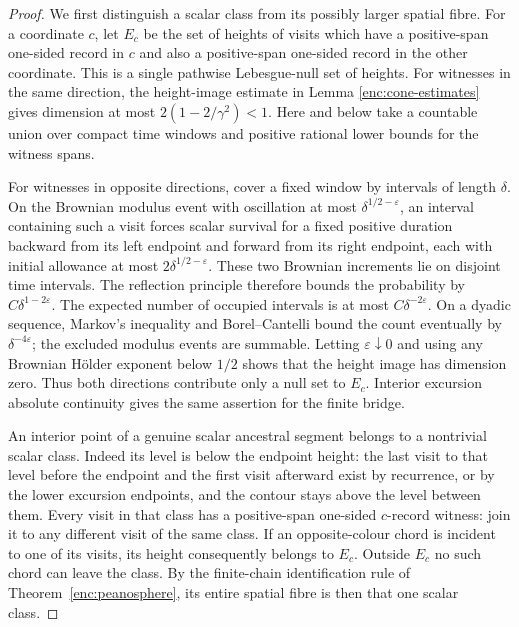 \documentclass[11pt]{article}
\numberwithin{equation}{section}
\theoremstyle{definition}
\theoremstyle{remark}
\newcommand{\1}{\mathbf 1}
\begin{document}
\begin{proof}
We first distinguish a scalar class from its possibly larger spatial
fibre.  For a coordinate \(c\), let \(E_c\) be the set of heights of
visits which have a positive-span one-sided record in \(c\) and also
a positive-span one-sided record in the other coordinate.  This is
a single pathwise Lebesgue-null set of heights.  For witnesses in the
same direction, the height-image estimate in Lemma
\ref{enc:cone-estimates} gives dimension at most
\(2(1-2/\gamma^2)<1\).  Here and below take a countable union over
compact time windows and positive rational lower bounds for the
witness spans.

For witnesses in opposite directions, cover a fixed window by intervals
of length \(\delta\).  On the Brownian modulus event with oscillation
at most \(\delta^{1/2-\varepsilon}\), an interval containing such a
visit forces scalar survival for a fixed positive duration backward
from its left endpoint and forward from its right endpoint, each
with initial allowance at most \(2\delta^{1/2-\varepsilon}\).
These two Brownian increments lie on disjoint time intervals.
The reflection principle therefore bounds the probability by
\(C\delta^{1-2\varepsilon}\).  The expected number of occupied
intervals is at most \(C\delta^{-2\varepsilon}\).
On a dyadic sequence, Markov's inequality and Borel--Cantelli bound
the count eventually by \(\delta^{-4\varepsilon}\); the excluded
modulus events are summable.  Letting \(\varepsilon\downarrow0\)
and using any Brownian H\"older exponent below \(1/2\) shows that
the height image has dimension zero.  Thus both directions contribute
only a null set to \(E_c\).  Interior excursion absolute continuity
gives the same assertion for the finite bridge.

An interior point of a genuine scalar ancestral segment belongs to a
nontrivial scalar class.  Indeed its level is below the endpoint
height: the last visit to that level before the endpoint and the
first visit afterward exist by recurrence, or by the lower excursion
endpoints, and the contour stays above the level between them.
Every visit in that class has a positive-span
one-sided \(c\)-record witness: join it to any different visit of the
same class.  If an opposite-colour chord is incident to one of its
visits, its height consequently belongs to \(E_c\).  Outside \(E_c\)
no such chord can leave the class.  By the finite-chain identification
rule of Theorem~\ref{enc:peanosphere}, its entire spatial fibre is then
that one scalar class.


\end{proof}
\end{document}
